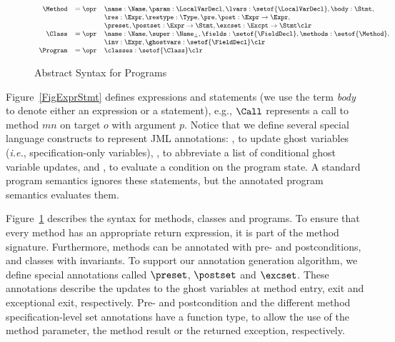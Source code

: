 \begin{figure}[t]
\[{\small
\begin{array}{rcl}
\Method & = \opr & \name : \Name,
                   \param : \LocalVarDecl,
                   \lvars : \setof{\LocalVarDecl},
                   \body : \Stmt,\\
        &        & \res : \Expr,
                   \restype : \Type,
                   \pre, \post : \Expr \rightarrow \Expr, \\
        &        & \preset, \postset : \Expr \rightarrow \Stmt,
                   \excset : \Excpt \rightarrow \Stmt \clr \\
\Class & = \opr & \name : \Name,
                  \super : \Name_{\bot},
                  \fields : \setof{\FieldDecl},
                  \methods : \setof{\Method},\\
        &       & \inv : \Expr,
                  \ghostvars : \setof{\FieldDecl} \clr\\
\Program & = \opr & \classes : \setof{\Class} \clr
\end{array}}
\]
\caption{Abstract Syntax for Programs}\label{FigProgram}
\end{figure}


Figure~\ref{FigExprStmt} defines expressions and statements
(we use the term \emph{body} to denote either an expression or a
statement), e.g., \(\Call\) represents a call to method \(mn\) on
target \(o\) with argument \(p\). Notice that we define several
special language constructs to represent JML annotations: \Set, to
update ghost variables (\emph{i.e.}, specification-only variables),
\CaseJML, to abbreviate a list of conditional ghost variable updates,
and \Assert, to evaluate a condition on the program state. A standard
program semantics ignores these statements, but the annotated program
semantics evaluates them.

Figure~\ref{FigProgram} describes the syntax for methods,
classes and programs. To ensure that every method has an appropriate
return expression, it is part of the method signature.
Furthermore, methods can be annotated with pre- and postconditions, and
classes with invariants. To support our annotation generation
algorithm, we define special annotations called
\(\preset\), \(\postset\) and \(\excset\). These annotations describe
the updates to the ghost variables at method entry, exit and
exceptional exit, respectively.
Pre- and postcondition and the different method specification-level set
annotations have a function type, to allow the use of the method parameter,
the method result or the returned exception, respectively.

